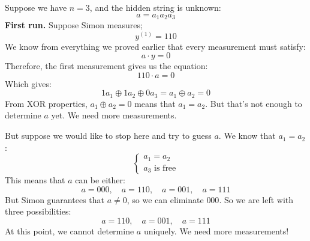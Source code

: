 \begin{examplebox}[: $n=3$ and $a = 111$]
    Suppose we have $n=3$, and the hidden string is unknown:
    \begin{equation*}
        a = a_1 a_2 a_3
    \end{equation*}
    \textbf{First run.} Suppose Simon measures;
    \begin{equation*}
        y^{(1)} = 110
    \end{equation*}
    We know from everything we proved earlier that every measurement must satisfy:
    \begin{equation*}
        a \cdot y = 0
    \end{equation*}
    Therefore, the first measurement gives us the equation:
    \begin{equation*}
        110 \cdot a = 0
    \end{equation*}
    Which gives:
    \begin{equation*}
        1 a_1 \oplus 1 a_2 \oplus 0 a_3 = a_1 \oplus a_2 = 0
    \end{equation*}
    From XOR properties, $a_1 \oplus a_2 = 0$ means that $a_1 = a_2$. But that's not enough to determine $a$ yet. We need more measurements.

    \highspace
    But suppose we would like to stop here and try to guess $a$. We know that $a_1 = a_2$:
    \begin{equation*}
        \begin{cases}
            a_1 = a_2 \\
            a_3 \text{ is free}
        \end{cases}
    \end{equation*}
    This means that $a$ can be either:
    \begin{equation*}
        a = 000, \quad a = 110, \quad a = 001, \quad a = 111
    \end{equation*}
    But Simon guarantees that $a \neq 0$, so we can eliminate $000$.
    So we are left with three possibilities:
    \begin{equation*}
        a = 110, \quad a = 001, \quad a = 111
    \end{equation*}
    At this point, we cannot determine $a$ uniquely. We need more measurements!


\end{examplebox}
